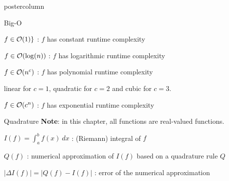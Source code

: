 \documentclass{beamer}
\begin{document}
\begin{frame}[fragile]{}
\begin{columns}
\begin{column}{.31\textwidth}
\begin{beamercolorbox}[center]{postercolumn}
\begin{minipage}{.98\textwidth}
{\begin{myblock}{Big-O}
						\begin{codebox}
						$f \in \mathcal{O}(1)\}$ : $f$ has constant runtime complexity
						\end{codebox}
						\hspace*{1ex}
						\begin{codebox}
						$f \in \mathcal{O}(\log(n)) $ : $f$ has logarithmic runtime complexity
						\end{codebox}
						\hspace*{1ex}
						\begin{codebox}
						$f \in \mathcal{O}(n^c) $ : $f$ has polynomial runtime complexity
						\end{codebox}
						\hspace*{1ex} linear for $c = 1$, quadratic for $c = 2$ and cubic for $c = 3$. \\
						\begin{codebox}
						$f \in \mathcal{O}(c^n) $ : $f$ has exponential runtime complexity
						\end{codebox}
					\end{myblock}
					\begin{myblock}{Quadrature}
						\textbf{Note}: in this chapter, all functions are real-valued functions.
						\vspace*{3ex}
						\begin{codebox}
							$I(f) = \int_a^b f(x)~dx$ : (Riemann) integral of $f$
						\end{codebox}
						\hspace*{1ex}
						\begin{codebox}
							$Q(f)$ : numerical approximation of $I(f)$ based on a quadrature rule $Q$
						\end{codebox}
						\hspace*{1ex}
						\begin{codebox}
							$|\Delta I(f)| = |Q(f) - I(f)|$ : error of the numerical approximation
						\end{codebox}
					\end{myblock}		
}
\end{minipage}
\end{beamercolorbox}
\end{column}
\end{columns}
\end{frame}
\end{document}

